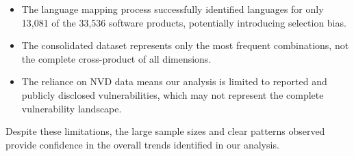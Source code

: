 \begin{itemize}
    \item The language mapping process successfully identified languages for only 13,081 of the 33,536 software products, potentially introducing selection bias.
    \item The consolidated dataset represents only the most frequent combinations, not the complete cross-product of all dimensions.
    \item The reliance on NVD data means our analysis is limited to reported and publicly disclosed vulnerabilities, which may not represent the complete vulnerability landscape.
\end{itemize}

Despite these limitations, the large sample sizes and clear patterns observed provide confidence in the overall trends identified in our analysis.
